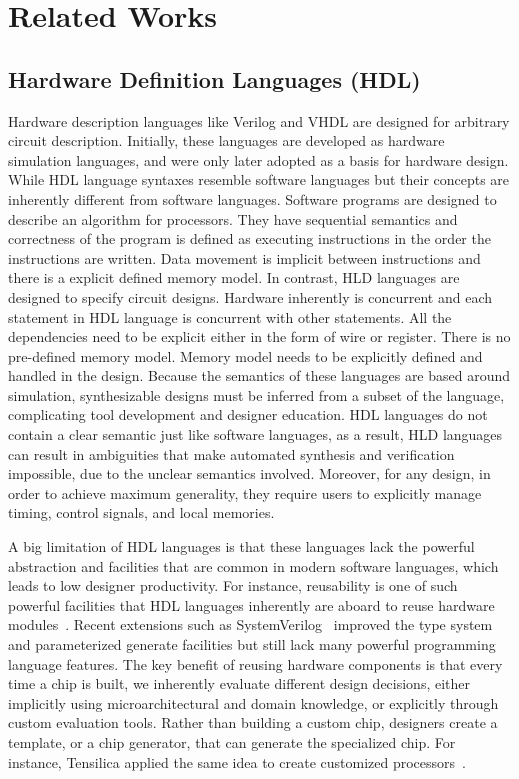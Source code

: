 

\chapter{Related Works}

\section{Hardware Definition Languages (HDL)}

Hardware description languages like Verilog and VHDL are designed for arbitrary circuit description.
Initially, these languages are developed as hardware simulation languages, and were only later adopted as a basis for hardware design.
While HDL language syntaxes resemble software languages but their concepts are inherently different from software languages.
Software programs are designed to describe an algorithm for processors.
They have sequential semantics and correctness of the program is defined as executing instructions in the order the instructions are written.
Data movement is implicit between instructions and there is a explicit defined memory model.
In contrast, HLD languages are designed to specify circuit designs.
Hardware inherently is concurrent and each statement in HDL language is concurrent with other statements.
All the dependencies need to be explicit either in the form of wire or register.
There is no pre-defined memory model. Memory model needs to be explicitly defined and handled in the design.
Because the semantics of these languages are based around simulation, synthesizable designs must be inferred from a subset of the language, complicating tool development and designer education.
HDL languages do not contain a clear semantic just like software languages, as a result, HLD languages can result in ambiguities that make automated synthesis and verification impossible, due to the unclear semantics involved.
Moreover, for any design, in order to achieve maximum generality, they require users to explicitly manage timing, control signals, and local memories.

A big limitation of HDL languages is that these languages lack the powerful abstraction and facilities that are common in modern software languages, which leads to low designer productivity.
For instance, reusability is one of such powerful facilities that HDL languages inherently are aboard to reuse hardware modules~\cite{shacham_rethinking_2010}.
Recent extensions such as SystemVerilog~\cite{systemverilog} improved the type system and parameterized generate facilities but still lack many powerful programming language features.
The key benefit of reusing hardware components is that every time a chip is built, we inherently evaluate different design decisions, either implicitly using microarchitectural and domain knowledge, or explicitly through custom evaluation tools.
Rather than building a custom chip, designers create a template, or a chip generator, that can generate the specialized chip.
For instance, Tensilica applied the same idea to create customized processors~\cite{tensillica}.


